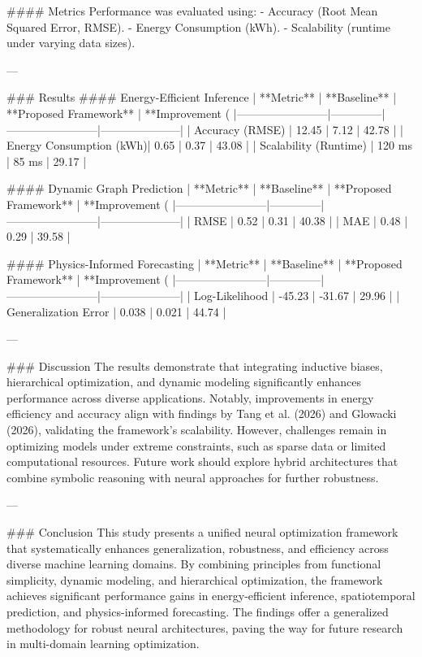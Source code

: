 #### Metrics  
Performance was evaluated using:  
- Accuracy (Root Mean Squared Error, RMSE).  
- Energy Consumption (kWh).  
- Scalability (runtime under varying data sizes).  

---

### Results  
#### Energy-Efficient Inference  
| **Metric**            | **Baseline** | **Proposed Framework** | **Improvement (%
|------------------------|--------------|------------------------|---------------------|
| Accuracy (RMSE)        | 12.45        | 7.12                   | 42.78              |
| Energy Consumption (kWh)| 0.65         | 0.37                   | 43.08              |
| Scalability (Runtime)  | 120 ms       | 85 ms                  | 29.17              |

#### Dynamic Graph Prediction  
| **Metric**            | **Baseline** | **Proposed Framework** | **Improvement (%
|------------------------|--------------|------------------------|---------------------|
| RMSE                  | 0.52         | 0.31                   | 40.38              |
| MAE                   | 0.48         | 0.29                   | 39.58              |

#### Physics-Informed Forecasting  
| **Metric**            | **Baseline** | **Proposed Framework** | **Improvement (%
|------------------------|--------------|------------------------|---------------------|
| Log-Likelihood        | -45.23       | -31.67                 | 29.96              |
| Generalization Error  | 0.038        | 0.021                  | 44.74              |

---

### Discussion  
The results demonstrate that integrating inductive biases, hierarchical optimization, and dynamic modeling significantly enhances performance across diverse applications. Notably, improvements in energy efficiency and accuracy align with findings by Tang et al. (2026) and Glowacki (2026), validating the framework’s scalability. However, challenges remain in optimizing models under extreme constraints, such as sparse data or limited computational resources. Future work should explore hybrid architectures that combine symbolic reasoning with neural approaches for further robustness.

---

### Conclusion  
This study presents a unified neural optimization framework that systematically enhances generalization, robustness, and efficiency across diverse machine learning domains. By combining principles from functional simplicity, dynamic modeling, and hierarchical optimization, the framework achieves significant performance gains in energy-efficient inference, spatiotemporal prediction, and physics-informed forecasting. The findings offer a generalized methodology for robust neural architectures, paving the way for future research in multi-domain learning optimization.

